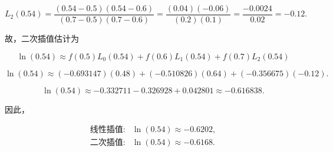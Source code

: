 \documentclass[11pt]{article}
\begin{document}
\[
L_2(0.54)=\frac{(0.54-0.5)(0.54-0.6)}{(0.7-0.5)(0.7-0.6)}
=\frac{(0.04)(-0.06)}{(0.2)(0.1)}
=\frac{-0.0024}{0.02}=-0.12.
\]

故，二次插值估计为

\[
\ln(0.54) \approx f(0.5)L_0(0.54) + f(0.6)L_1(0.54) + f(0.7)L_2(0.54)
\]

\[
\ln(0.54) \approx (-0.693147)(0.48) + (-0.510826)(0.64) + (-0.356675)(-0.12).
\]

\[
\ln(0.54) \approx -0.332711 - 0.326928 + 0.042801 \approx -0.616838.
\]

因此，

\[
\boxed{\begin{array}{ll}
\text{线性插值:} & \ln(0.54)\approx -0.6202, \\
\text{二次插值:} & \ln(0.54)\approx -0.6168.
\end{array}}
\]


    
    
    
\end{document}

